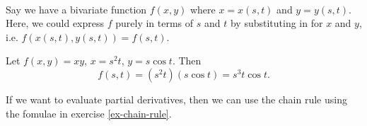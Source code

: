 \documentclass[../multivariate_calculus.tex]{subfiles}
\begin{document}
        \paragraph{}
        Say we have a bivariate function $f(x,y)$ where $x=x(s,t)$ and $y=y(s,t)$.
        Here, we could express $f$ purely in terms of $s$ and $t$ by substituting in for $x$ and $y$, i.e. $f(x(s,t),y(s,t))=f(s,t)$.
        \begin{example}
            Let $f(x,y)=xy$, $x=s^2t$, $y=s\cos t$. Then
            \begin{equation}
                f(s,t)=(s^2t)(s\cos t)=s^3 t\cos t.
            \end{equation}
        \end{example}
        If we want to evaluate partial derivatives, then we can use the chain rule using the fomulae in exercise \ref{ex-chain-rule}.
\end{document}
